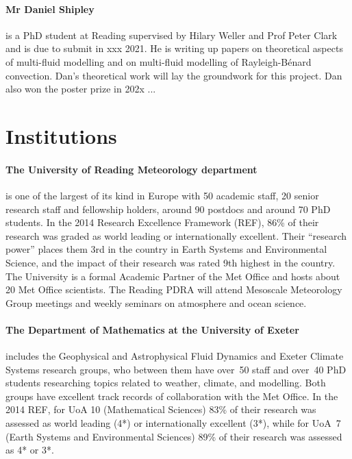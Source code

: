\documentclass[11pt,a4paper]{article}
\begin{document}
\paragraph*{Mr Daniel Shipley} is a PhD student at Reading supervised by Hilary Weller and Prof Peter Clark and is due to submit in xxx 2021. He is writing up papers on theoretical aspects of multi-fluid modelling and on multi-fluid modelling of Rayleigh-B\'{e}nard convection. Dan's theoretical work will lay the groundwork for this project. Dan also won the poster prize in 202x ...

\section*{Institutions}

\paragraph*{The University of Reading Meteorology department} is one of the largest of its kind in Europe with 50 academic staff, 20 senior research staff and fellowship holders, around 90 postdocs and around 70 PhD students. In the 2014 Research Excellence Framework (REF), 86\% of their research was graded as world leading or internationally excellent. Their ``research power'' places them 3rd in the country in Earth Systems and Environmental Science, and the impact of their research was rated 9th highest in the country. The University is a formal Academic Partner of the Met Office and hosts about 20 Met Office scientists. The Reading PDRA will attend Mesoscale Meteorology Group meetings and weekly seminars on atmosphere and ocean science.

\paragraph*{The Department of Mathematics at the University of Exeter} includes the Geophysical and Astrophysical Fluid Dynamics and Exeter Climate Systems research groups, who between them have over~50 staff and over~40 PhD students researching topics related to weather, climate, and modelling. Both groups have excellent track records of collaboration with the Met Office. In the 2014 REF, for UoA 10 (Mathematical Sciences) 83\% of their research was assessed as world leading (4*) or internationally excellent (3*), while for UoA~7 (Earth Systems and Environmental Sciences) 89\% of their research was assessed as 4* or 3*.
\end{document}
